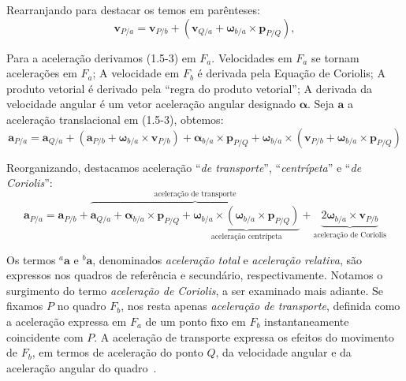 Rearranjando para destacar os temos em parênteses\footnotemark{}:
\begin{equation*}
    \mathbf{v}_{P/a} = \mathbf{v}_{P/b} + \left( \mathbf{v}_{Q/a} + \mathbf{\omega}_{b/a}\!\times\!\mathbf{p}_{P/Q} \right),
\end{equation*}

Para a aceleração derivamos (1.5-3) em \(F_{a}\). Velocidades em \(F_{a}\) se tornam acelerações em \(F_{a}\); A velocidade em \(F_{b}\) é derivada pela Equação de Coriolis; A produto vetorial é derivado pela ``regra do produto vetorial''; A derivada da velocidade angular é um vetor aceleração angular designado \(\mathbf{\alpha}\). Seja \(\mathbf{a}\) a aceleração translacional em (1.5-3), obtemos:
\begin{equation*}
    \mathbf{a}_{P/a} = \mathbf{a}_{Q/a} + \left(\mathbf{a}_{P/b} + \mathbf{\omega}_{b/a}\!\times\!\mathbf{v}_{P/b}\right) + {{\mathbf{\alpha}_{b/a}}\!\times\!{\mathbf{p}_{P/Q}}} + {\mathbf{\omega}_{b/a}}\!\times\!{\left({\mathbf{v}_{P/b}} + {{\mathbf{\omega}_{b/a}}\!\times\!{\mathbf{p}_{P/Q}}}\right)}
\end{equation*}

Reorganizando, destacamos aceleração ``\emph{de transporte}'', ``\emph{centrípeta}'' e ``\emph{de Coriolis}'':
\begin{equation*}
    \mathbf{a}_{P/a} = \mathbf{a}_{P/b} + \overbrace{\mathbf{a}_{Q/a} + {{\mathbf{\alpha}_{b/a}}\!\times\!{\mathbf{p}_{P/Q}}} + \underbrace{{{\mathbf{\omega}_{b/a}}\!\times\!{\left({\mathbf{\omega}_{b/a}}\!\times\!{\mathbf{p}_{P/Q}}\right)}}}_{\text{aceleração centrípeta}}}^{\text{aceleração de transporte}} + \underbrace{{2\mathbf{\omega}_{b/a}\!\times\!\mathbf{v}_{P/b}}}_{\text{aceleração de Coriolis}} \tag{1.5-4}
\end{equation*}


Os termos \({^{a}\mathbf{a}}\) e \({^{b}\mathbf{a}}\), denominados \emph{aceleração total} e \emph{aceleração relativa}, são expressos nos quadros de referência e secundário, respectivamente. Notamos o surgimento do termo \textit{aceleração de Coriolis}, a ser examinado mais adiante. Se fixamos \(P\) no quadro \(F_{b}\), nos resta apenas \textit{aceleração de  transporte}, definida como a aceleração expressa em \(F_{a}\) de um ponto fixo em \(F_{b}\) instantaneamente coincidente com \(P\). A aceleração de transporte expressa os efeitos do movimento de \(F_{b}\), em termos de aceleração do ponto \(Q\), da velocidade angular e da aceleração angular do quadro~\cite{Stevens2016}.


